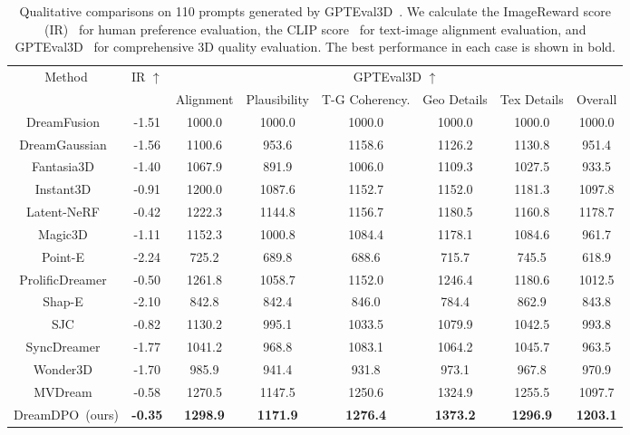 \begin{table*}[t] 
    \centering
    \caption{
    Qualitative comparisons on 110 prompts generated by GPTEval3D~\protect\citep{wu2024gpt}.
    We calculate the ImageReward score (IR)~\protect\citep{xu2024imagereward} for human preference evaluation, the CLIP score~\protect\citep{radford2021clip} for text-image alignment evaluation, and GPTEval3D~\protect\citep{wu2024gpt} for comprehensive 3D quality evaluation. The best performance in each case is shown in bold.
    }
    \begin{tabular}{c|ccccccc} 
    \toprule
    \multirow{2}{*}{Method} & \multirow{2}{*}{IR $\uparrow$}  & \multicolumn{6}{c}{GPTEval3D $\uparrow$} \\ \cmidrule{3-8}
    & & \footnotesize Alignment & \footnotesize Plausibility & \scriptsize T-G Coherency. & \footnotesize Geo Details &  \footnotesize Tex Details & \footnotesize Overall \\
    \midrule
    DreamFusion~\citep{poole2022dreamfusion} & -1.51 & 1000.0 & 1000.0 & 1000.0 & 1000.0 & 1000.0 & 1000.0 \\
    DreamGaussian~\citep{tang2023dreamgaussian} & -1.56 & 1100.6 & 953.6 & 1158.6 & 1126.2 & 1130.8 & 951.4 \\
    Fantasia3D~\citep{chen2023fantasia3d} & -1.40 & 1067.9 & 891.9 & 1006.0 & 1109.3 & 1027.5 & 933.5 \\
    Instant3D~\citep{li2023instant3d} & -0.91 & 1200.0 & 1087.6 & 1152.7 & 1152.0 & 1181.3 & 1097.8 \\
    Latent-NeRF~\citep{metzer2023latent} & -0.42  & 1222.3 & 1144.8 & 1156.7 & 1180.5 & 1160.8 & 1178.7 \\
    Magic3D~\citep{lin2023magic3d} & -1.11 & 1152.3 & 1000.8 & 1084.4 & 1178.1 & 1084.6 & 961.7 \\
    Point-E~\citep{nichol2022point} & -2.24  & 725.2 & 689.8 & 688.6 & 715.7 & 745.5 & 618.9 \\
    ProlificDreamer~\citep{wang2023prolificdreamer} & -0.50 & 1261.8 & 1058.7 & 1152.0 & 1246.4 & 1180.6 & 1012.5 \\
    Shap-E~\citep{jun2023shap} & -2.10 & 842.8 & 842.4 & 846.0 & 784.4 & 862.9 & 843.8 \\
    SJC~\citep{wang2023score} & -0.82 & 1130.2 & 995.1 & 1033.5 & 1079.9 & 1042.5 & 993.8 \\
    SyncDreamer~\citep{liu2023syncdreamer} & -1.77 & 1041.2 & 968.8 & 1083.1 & 1064.2 & 1045.7 & 963.5 \\
    Wonder3D~\citep{long2024wonder3d} & -1.70 & 985.9 & 941.4 & 931.8 & 973.1 & 967.8 & 970.9 \\
    MVDream~\citep{shi2023mvdream} & -0.58 & 1270.5 & 1147.5 & 1250.6 & 1324.9 & 1255.5 & 1097.7 \\
    \midrule
    DreamDPO~(ours) & \textbf{-0.35} & \textbf{1298.9} & \textbf{1171.9} & \textbf{1276.4} & \textbf{1373.2} & \textbf{1296.9} & \textbf{1203.1} \\
\bottomrule
    \end{tabular}
    \label{tab:qua_comp}
\end{table*}

